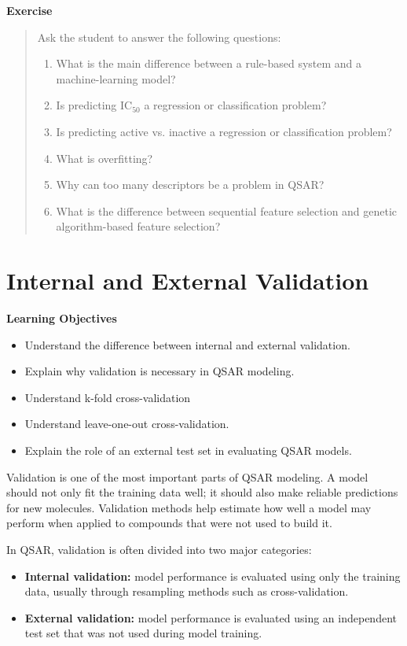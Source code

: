 \documentclass[11pt]{report}
\newenvironment{Important note}{\begin{quote}\color{red}\textbf{Important note:} }{\end{quote}}
\newenvironment{learningobjectives}
{\vspace{0.5em}\noindent\textbf{Learning Objectives}\begin{itemize}[leftmargin=*]}
{\end{itemize}\vspace{0.5em}}
\newenvironment{exercise}
{\vspace{0.5em}\noindent\textbf{Exercise}\begin{quote}}
{\end{quote}\vspace{0.5em}}
\begin{document}
\begin{exercise}
Ask the student to answer the following questions:

\begin{enumerate}[leftmargin=*]
    \item What is the main difference between a rule-based system and a machine-learning model?
    \item Is predicting IC$_{50}$ a regression or classification problem?
    \item Is predicting active vs. inactive a regression or classification problem?
    \item What is overfitting?
    \item Why can too many descriptors be a problem in QSAR?
    \item What is the difference between sequential feature selection and genetic algorithm-based feature selection?
\end{enumerate}
\end{exercise}


\chapter{Internal and External Validation}

\begin{learningobjectives}
    \item Understand the difference between internal and external validation.
    \item Explain why validation is necessary in QSAR modeling.
    \item Understand k-fold cross-validation 
    \item Understand leave-one-out cross-validation.
    \item Explain the role of an external test set in evaluating QSAR models.
\end{learningobjectives}

Validation is one of the most important parts of QSAR modeling. A model should not only fit the training data well; it should also make reliable predictions for new molecules. Validation methods help estimate how well a model may perform when applied to compounds that were not used to build it.

In QSAR, validation is often divided into two major categories:

\begin{itemize}[leftmargin=*]
    \item \textbf{Internal validation:} model performance is evaluated using only the training data, usually through resampling methods such as cross-validation.
    \item \textbf{External validation:} model performance is evaluated using an independent test set that was not used during model training.
\end{itemize}
\end{document}
